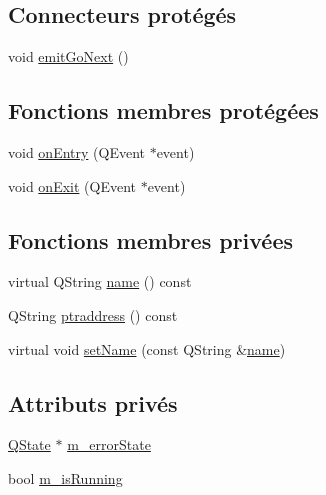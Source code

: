\subsection*{Connecteurs protégés}
\begin{DoxyCompactItemize}
\item 
void \hyperlink{classSimpleHotel_1_1SH__GenericStateMachine_a37846ee6a4cb4d73cf2aff51cb025615}{emit\-Go\-Next} ()
\end{DoxyCompactItemize}
\subsection*{Fonctions membres protégées}
\begin{DoxyCompactItemize}
\item 
void \hyperlink{classSimpleHotel_1_1SH__GenericStateMachine_a42c47602883a70ef4965cff373cd5ab6}{on\-Entry} (Q\-Event $\ast$event)
\item 
void \hyperlink{classSimpleHotel_1_1SH__GenericStateMachine_adecc9814338e400f9fce1cc637f1e081}{on\-Exit} (Q\-Event $\ast$event)
\end{DoxyCompactItemize}
\subsection*{Fonctions membres privées}
\begin{DoxyCompactItemize}
\item 
virtual Q\-String \hyperlink{classSimpleHotel_1_1SH__NamedObject_ad144716345034c91cface8f3163a799e}{name} () const 
\item 
Q\-String \hyperlink{classSimpleHotel_1_1SH__NamedObject_af64f64d8af4f899c0626974bbf15698c}{ptraddress} () const 
\item 
virtual void \hyperlink{classSimpleHotel_1_1SH__NamedObject_a1e11501093109612bb85ea24a1eba7cb}{set\-Name} (const Q\-String \&\hyperlink{classSimpleHotel_1_1SH__NamedObject_ad144716345034c91cface8f3163a799e}{name})
\end{DoxyCompactItemize}
\subsection*{Attributs privés}
\begin{DoxyCompactItemize}
\item 
\hyperlink{classQState}{Q\-State} $\ast$ \hyperlink{classSimpleHotel_1_1SH__GenericStateMachine_af80b97874f58dfc58f48021dd6cb24eb}{m\-\_\-error\-State}
\item 
bool \hyperlink{classSimpleHotel_1_1SH__GenericStateMachine_a703eee4728e3d7b457688500daf45595}{m\-\_\-is\-Running}
\end{DoxyCompactItemize}


